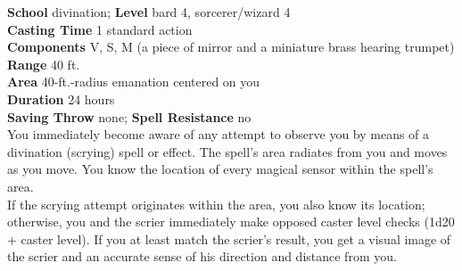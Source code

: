 \textbf{School} divination; \textbf{Level} bard 4, sorcerer/wizard 4\\
\textbf{Casting Time} 1 standard action\\
\textbf{Components} V, S, M (a piece of mirror and a miniature brass hearing trumpet)\\
\textbf{Range} 40 ft.\\
\textbf{Area} 40-ft.-radius emanation centered on you\\
\textbf{Duration} 24 hours\\
\textbf{Saving Throw} none; \textbf{Spell Resistance} no\\
You immediately become aware of any attempt to observe you by means of a divination (scrying) spell or effect. The spell's area radiates from you and moves as you move. You know the location of every magical sensor within the spell's area.\\
If the scrying attempt originates within the area, you also know its location; otherwise, you and the scrier immediately make opposed caster level checks (1d20 + caster level). If you at least match the scrier's result, you get a visual image of the scrier and an accurate sense of his direction and distance from you.\\
